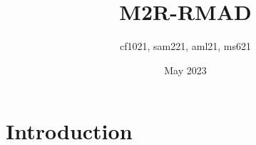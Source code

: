 \documentclass{article}
\title{M2R-RMAD}
\author{cf1021, sam221, aml21, ms621}
\date{May 2023}
\begin{document}
\maketitle

\section{Introduction}
\end{document}
